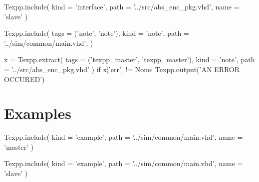 \documentclass[12pt]{article}
\begin{document}
\begin{texpp}
Texpp.include(
 kind = 'interface',
 path = '../src/abs_enc_pkg.vhd',
 name = 'slave'
)
\end{texpp}

\begin{texpp}
Texpp.include(
 tags = ('note', 'note'),
 kind = 'note',
 path = '../sim/common/main.vhd',
)
\end{texpp}

\begin{texpp}
x = Texpp.extract(
 tags = ('texpp_master', 'texpp_master'),
 kind = 'note',
 path = '../src/abs_enc_pkg.vhd'
)
if x['err'] != None: Texpp.output('AN ERROR OCCURED')
\end{texpp}


\newpage
\section{Examples}

\begin{texpp}
Texpp.include(
 kind = 'example',
 path = '../sim/common/main.vhd',
 name = 'master'
)
\end{texpp}

\begin{texpp}
Texpp.include(
 kind = 'example',
 path = '../sim/common/main.vhd',
 name = 'slave'
)
\end{texpp}
\end{document}
